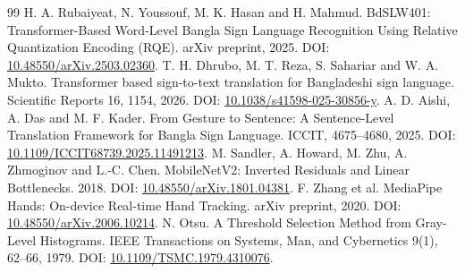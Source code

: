 \documentclass[11pt,a4paper]{article}
\begin{document}
\begin{thebibliography}{99}
 H. A. Rubaiyeat, N. Youssouf, M. K. Hasan and H. Mahmud. BdSLW401: Transformer-Based Word-Level Bangla Sign Language Recognition Using Relative Quantization Encoding (RQE). arXiv preprint, 2025. DOI: \href{https://doi.org/10.48550/arXiv.2503.02360}{10.48550/arXiv.2503.02360}.
 T. H. Dhrubo, M. T. Reza, S. Sahariar and W. A. Mukto. Transformer based sign-to-text translation for Bangladeshi sign language. Scientific Reports 16, 1154, 2026. DOI: \href{https://doi.org/10.1038/s41598-025-30856-y}{10.1038/s41598-025-30856-y}.
 A. D. Aishi, A. Das and M. F. Kader. From Gesture to Sentence: A Sentence-Level Translation Framework for Bangla Sign Language. ICCIT, 4675--4680, 2025. DOI: \href{https://doi.org/10.1109/ICCIT68739.2025.11491213}{10.1109/ICCIT68739.2025.11491213}.
 M. Sandler, A. Howard, M. Zhu, A. Zhmoginov and L.-C. Chen. MobileNetV2: Inverted Residuals and Linear Bottlenecks. 2018. DOI: \href{https://doi.org/10.48550/arXiv.1801.04381}{10.48550/arXiv.1801.04381}.
 F. Zhang et al. MediaPipe Hands: On-device Real-time Hand Tracking. arXiv preprint, 2020. DOI: \href{https://doi.org/10.48550/arXiv.2006.10214}{10.48550/arXiv.2006.10214}.
 N. Otsu. A Threshold Selection Method from Gray-Level Histograms. IEEE Transactions on Systems, Man, and Cybernetics 9(1), 62--66, 1979. DOI: \href{https://doi.org/10.1109/TSMC.1979.4310076}{10.1109/TSMC.1979.4310076}.
\end{thebibliography}
\end{document}
